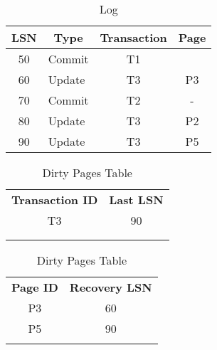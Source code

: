 \begin{table}[H]
\centering
\begin{tabular}{|c|l|c|c|}
\hline
\textbf{LSN}           & \multicolumn{1}{c|}{\textbf{Type}} & \textbf{Transaction}  & \textbf{Page}         \\ \hline
50                     & Commit                             & T1                    &                       \\ \hline
60                     & Update                             & T3                    & P3                    \\ \hline
70                     & Commit                             & T2                    & -                     \\ \hline
80                     & Update                             & T3                    & P2                    \\ \hline
90                     & Update                             & T3                    & P5                    \\ \hline
\end{tabular}
\caption{Log}
\end{table}


\begin{table}[H]
    \begin{minipage}{.5\linewidth}
      \centering
		\begin{tabular}{|c|c|}
		\cline{1-2}
		\textbf{Transaction ID} & \textbf{Last LSN} \\ \cline{1-2}
		T3             & 90       \\ \cline{1-2}
		               &          \\ \cline{1-2}
		               &          \\ \cline{1-2}
		\end{tabular}
      \caption{Active Transactions Table}

    \end{minipage}%
    \begin{minipage}{.5\linewidth}
      \centering
		\begin{tabular}{|c|c|}
		\cline{1-2}
		\textbf{Page ID} & \textbf{Recovery LSN} \\ \cline{1-2}
		P3      & 60           \\ \cline{1-2}
		P5      & 90           \\ \cline{1-2}
		        &              \\ \cline{1-2}
		\end{tabular}
        \caption{Dirty Pages Table}

    \end{minipage} 
\end{table}


